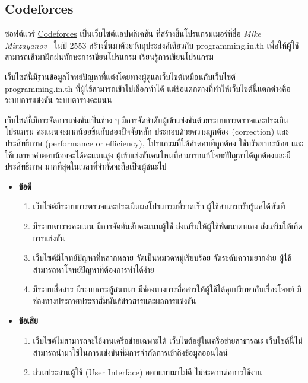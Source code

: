 \documentclass[12pt,oneside,openright,a4paper]{cpe-thai-project}
\begin{document}
    \subsection{Codeforces}
    \begin{flushleft}
    ซอฟต์แวร์ \href{https://codeforces.com}{Codeforces} เป็นเว็บไซต์แอปพลิเคชัน ที่สร้างขึ้นโปรแกรมเมอร์ที่ชื่อ \textit{Mike Mirzayanov}~\cite{codeforces} ในปี 2553 สร้างขึ้นมาด้วยวัตถุประสงค์เดียวกับ programming.in.th เพื่อให้ผู้ใช้สามารถเข้ามาฝึกฝนทักษะการเขียนโปรแกรม เรียนรู้การเขียนโปรแกรม 
    \end{flushleft}
    \begin{flushleft}
    เว็บไซต์นี้มีฐานข้อมูลโจทย์ปัญหาที่แต่งโดยทางผู้ดูแลเว็บไซต์เหมือนกับเว็บไซต์ programming.in.th ที่ผู้ใช้สามารถเข้าไปเลือกทำได้ แต่ข้อแตกต่างที่ทำให้เว็บไซต์นี้แตกต่างคือระบบการแข่งขัน ระบบตารางคะแนน
    \end{flushleft}
    \begin{flushleft}
    เว็บไซต์นี้มีการจัดการแข่งขันเป็นช่วง ๆ มีการจัดลำดับผู้เข้าแข่งขันด้วยระบบการตรวจและประเมินโปรแกรม คะแนนจะมากน้อยขึ้นกับสองปัจจัยหลัก ประกอบด้วยความถูกต้อง (correction) และประสิทธิภาพ (performance or efficiency), โปรแกรมที่ให้คำตอบที่ถูกต้อง ใช้ทรัพยากรน้อย และใช้เวลาหาคำตอบน้อยจะได้คะแนนสูง ผู้เข้าแข่งขันคนไหนที่สามารถแก้โจทย์ปัญหาได้ถูกต้องและมีประสิทธิภาพ มากที่สุดในเวลาที่จำกัดจะถือเป็นผู้ชนะไป
    \end{flushleft}

    \newpage
    
    \begin{itemize}
        \item \textbf{ข้อดี}
        \begin{enumerate}
            \item เว็บไซต์มีระบบการตรวจและประเมินผลโปรแกรมที่รวดเร็ว ผู้ใช้สามารถรับรู้ผลได้ทันที
            \item มีระบบตารางคะแนน มีการจัดอันดับคะแนนผู้ใช้ ส่งเสริมให้ผู้ใช้พัฒนาตนเอง ส่งเสริมให้เกิดการแข่งขัน
            \item เว็บไซต์มีโจทย์ปัญหาที่หลากหลาย จัดเป็นหมวดหมู่เรียบร้อย จัดระดับความยากง่าย ผู้ใช้สามารถหาโจทย์ปัญหาที่ต้องการทำได้ง่าย
            \item มีระบบสื่อสาร มีระบบกระทู้สนทนา มีช่องทางการสื่อสารให้ผู้ใช้ได้คุยปรึกษากันเรื่องโจทย์ มีช่องทางประกาศประชาสัมพันธ์ข่าวสารและผลการแข่งขัน
        \end{enumerate}
        \item \textbf{ข้อเสีย}
        \begin{enumerate}
            \item เว็บไซต์ไม่สามารถจะใช้งานเครือข่ายเฉพาะได้ เว็บไซต์อยู่ในเครือข่ายสาธารณะ เว็บไซต์นี้ไม่สามารถนำมาใช้ในการแข่งขันที่มีการจำกัดการเข้าถึงข้อมูลออนไลน์
            \item ส่วนประสานผู้ใช้ (User Interface) ออกแบบมาไม่ดี ไม่สะดวกต่อการใช้งาน
        \end{enumerate}
    \end{itemize}
    
\end{document}
